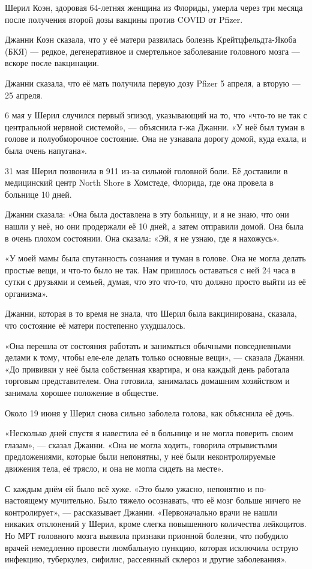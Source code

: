 Шерил Коэн, здоровая 64-летняя женщина из Флориды, умерла через три месяца после
получения второй дозы вакцины против COVID от Pfizer.

Джанни Коэн сказала, что у её матери развилась болезнь Крейтцфельдта-Якоба (БКЯ)
— редкое, дегенеративное и смертельное заболевание головного мозга — вскоре
после вакцинации.

Джанни сказала, что её мать получила первую дозу Pfizer 5 апреля, а вторую — 25
апреля.

6 мая у Шерил случился первый эпизод, указывающий на то, что «что-то не так с
центральной нервной системой», — объяснила г-жа Джанни. «У неё был туман в
голове и полуобморочное состояние. Она не узнавала дорогу домой, куда ехала, и
была очень напугана».

31 мая Шерил позвонила в 911 из-за сильной головной боли. Её доставили в
медицинский центр North Shore в Хомстеде, Флорида, где она провела в больнице 10
дней.

Джанни сказала: «Она была доставлена в эту больницу, и я не знаю, что они нашли
у неё, но они продержали её 10 дней, а затем отправили домой. Она была в очень
плохом состоянии. Она сказала: «Эй, я не узнаю, где я нахожусь».

«У моей мамы была спутанность сознания и туман в голове. Она не могла делать
простые вещи, и что-то было не так. Нам пришлось оставаться с ней 24 часа в
сутки с друзьями и семьей, думая, что это что-то, что должно просто выйти из её
организма».

Джанни, которая в то время не знала, что Шерил была вакцинирована, сказала, что состояние её матери постепенно ухудшалось.

«Она перешла от состояния работать и заниматься обычными повседневными делами к
тому, чтобы еле-еле делать только основные вещи», — сказала Джанни. «До прививки
у неё была собственная квартира, и она каждый день работала торговым
представителем. Она готовила, занималась домашним хозяйством и занимала хорошее
положение в обществе.

Около 19 июня у Шерил снова сильно заболела голова, как объяснила её дочь.

«Несколько дней спустя я навестила её в больнице и не могла поверить своим
глазам», — сказал Джанни. «Она не могла ходить, говорила отрывистыми
предложениями, которые были непонятны, у неё были неконтролируемые движения
тела, её трясло, и она не могла сидеть на месте».

С каждым днём ей было всё хуже. «Это было ужасно, непонятно и по-настоящему
мучительно. Было тяжело осознавать, что её мозг больше ничего не контролирует»,
— рассказывает Джанни. «Первоначально врачи не нашли никаких отклонений у Шерил,
кроме слегка повышенного количества лейкоцитов. Но МРТ головного мозга выявила
признаки прионной болезни, что побудило врачей немедленно провести люмбальную
пункцию, которая исключила острую инфекцию, туберкулез, сифилис, рассеянный
склероз и другие заболевания».

